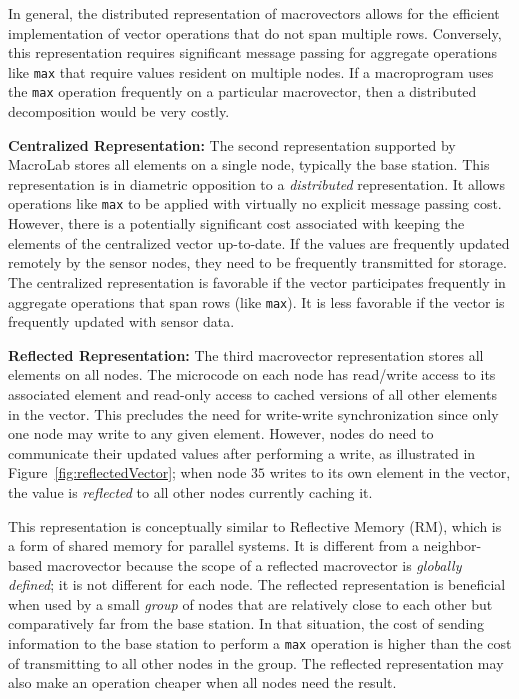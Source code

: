 In general, the distributed representation of macrovectors allows for the
efficient implementation of vector operations that do not span multiple rows.
Conversely, this representation requires significant message passing for
aggregate operations like {\tt max} that require values resident on multiple
nodes. If a macroprogram uses the {\tt max} operation frequently on a particular
macrovector, then a distributed decomposition would be very costly.

{\bf Centralized Representation:} The second representation supported by
MacroLab stores all elements on a single node, typically the base station. This
representation is in diametric opposition to a \emph{distributed}
representation. It allows operations like {\tt max} to be applied with virtually
no explicit message passing cost.  However, there is a potentially significant
cost associated with keeping the elements of the centralized vector
up-to-date. If the values are frequently updated remotely by the sensor nodes,
they need to be frequently transmitted for storage. The centralized
representation is favorable if the vector participates frequently in aggregate
operations that span rows (like {\tt max}). It is less favorable if the vector
is frequently updated with sensor data.

{\bf Reflected Representation:} The third macrovector representation stores all
elements on all nodes. The microcode on each node has read/write access to its
associated element and read-only access to cached versions of all other elements
in the vector. This precludes the need for write-write synchronization since
only one node may write to any given element. However, nodes do need to
communicate their updated values after performing a write, as illustrated in
Figure~\ref{fig:reflectedVector}; when node $35$ writes to its own element in
the vector, the value is {\em reflected} to all other nodes currently caching
it.

This representation is conceptually similar to Reflective Memory (RM), which is
a form of shared memory for parallel systems\cite{Jovanovic}.  It is different
from a neighbor-based macrovector because the scope of a reflected macrovector
is {\em globally defined}; it is not different for each node.  The reflected
representation is beneficial when used by a small {\em group} of nodes that are
relatively close to each other but comparatively far from the base station. In
that situation, the cost of sending information to the base station to perform a
{\tt max} operation is higher than the cost of transmitting to all other nodes
in the group. The reflected representation may also make an operation cheaper
when all nodes need the result.

